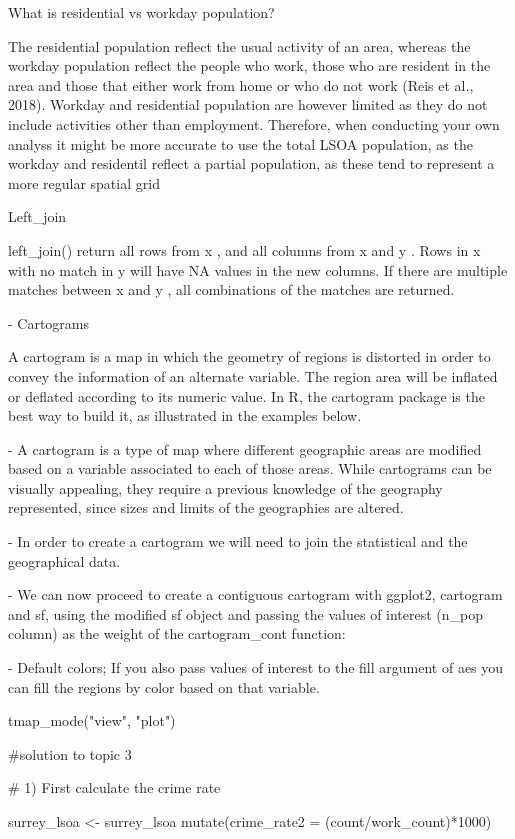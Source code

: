 \documentclass[12pt]{article}
\begin{document}
What is residential vs workday population? 

The residential population reflect the usual activity of an area, whereas the workday population reflect the people who work, those who are resident in the area and those that either work from home or who do not work (Reis et al., 2018). Workday and residential population are however limited as they do not include activities other than employment. Therefore, when conducting your own analyss it might be more accurate to use the total LSOA population, as the workday and residentil reflect a partial population, as these tend to represent a more regular spatial grid 


Left_join 

left_join() return all rows from x , and all columns from x and y . Rows in x with no match in y will have NA values in the new columns. If there are multiple matches between x and y , all combinations of the matches are returned.



- Cartograms 

A cartogram is a map in which the geometry of regions is distorted in order to convey the information of an alternate variable. The region area will be inflated or deflated according to its numeric value. In R, the cartogram package is the best way to build it, as illustrated in the examples below.

- A cartogram is a type of map where different geographic areas are modified based on a variable associated to each of those areas. While cartograms can be visually appealing, they require a previous knowledge of the geography represented, since sizes and limits of the geographies are altered.

- In order to create a cartogram we will need to join the statistical and the geographical data.

- We can now proceed to create a contiguous cartogram with ggplot2, cartogram and sf, using the modified sf object and passing the values of interest (n_pop column) as the weight of the cartogram_cont function:

- Default colors; If you also pass values of interest to the fill argument of aes you can fill the regions by color based on that variable.


tmap_mode("view",  "plot")


#solution to topic 3 

# 1) First calculate the crime rate 

surrey_lsoa <- surrey_lsoa %
  mutate(crime_rate2 = (count/work_count)*1000)
\end{document}
